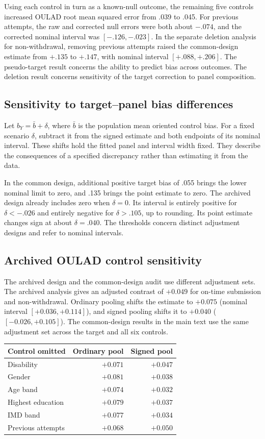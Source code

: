 Using each control in turn as a known-null outcome, the remaining five controls increased OULAD root mean squared error from .039 to .045. For previous attempts, the raw and corrected null errors were both about $-.074$, and the corrected nominal interval was $[-.126,-.023]$. In the separate deletion analysis for non-withdrawal, removing previous attempts raised the common-design estimate from $+.135$ to $+.147$, with nominal interval $[+.088,+.206]$. The pseudo-target result concerns the ability to predict bias across outcomes. The deletion result concerns sensitivity of the target correction to panel composition.

\subsection{Sensitivity to target--panel bias differences}

Let $b_Y=\bar b+\delta$, where $\bar b$ is the population mean oriented control bias. For a fixed scenario $\delta$, subtract it from the signed estimate and both endpoints of its nominal interval. These shifts hold the fitted panel and interval width fixed. They describe the consequences of a specified discrepancy rather than estimating it from the data.

In the common design, additional positive target bias of .055 brings the lower nominal limit to zero, and .135 brings the point estimate to zero. The archived design already includes zero when $\delta=0$. Its interval is entirely positive for $\delta<-.026$ and entirely negative for $\delta>.105$, up to rounding. Its point estimate changes sign at about $\delta=.040$. The thresholds concern distinct adjustment designs and refer to nominal intervals.


\subsection{Archived OULAD control sensitivity}

The archived design and the common-design audit use different adjustment sets. The archived analysis gives an adjusted contrast of $+0.049$ for on-time submission and non-withdrawal. Ordinary pooling shifts the estimate to $+0.075$ (nominal interval $[+0.036,+0.114]$), and signed pooling shifts it to $+0.040$ ($[-0.026,+0.105]$). The common-design results in the main text use the same adjustment set across the target and all six controls.

\begin{center}\small
\begin{tabular}{lrr}
\toprule
Control omitted & Ordinary pool & Signed pool \\
\midrule
Disability & $+0.071$ & $+0.047$\\
Gender & $+0.081$ & $+0.038$\\
Age band & $+0.074$ & $+0.032$\\
Highest education & $+0.079$ & $+0.037$\\
IMD band & $+0.077$ & $+0.034$\\
Previous attempts & $+0.068$ & $+0.050$\\
\bottomrule
\end{tabular}
\end{center}


